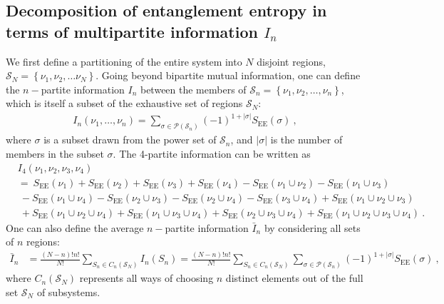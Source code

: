 \subsection{Decomposition of entanglement entropy in terms of multipartite information \(I_n\)}\label{entanglementDecomposition}
We first define a partitioning of the entire system into \(N\) disjoint regions, \(\mathcal{S}_N = \left\{ \nu_1, \nu_2,\ldots\nu_N\right\} \). Going beyond bipartite mutual information, one can define the \(n-\)partite information \(I_n\) between the members of \(\mathcal{S}_n = \left\{\nu_1,\nu_2,\ldots,\nu_n\right\} \), which is itself a subset of the exhaustive set of regions \(\mathcal{S}_N\):
\begin{equation}\begin{aligned}
	I_n(\nu_1,\ldots,\nu_n) = \sum_{\sigma \in \mathcal{P}\left(\mathcal{S}_n\right)} (-1)^{1 + |\sigma|} S_\text{EE}(\sigma)~,
\end{aligned}\end{equation}
where \(\sigma\) is a subset drawn from the power set of \(\mathcal{S}_n\), and \(|\sigma|\) is the number of members in the subset \(\sigma\). The 4-partite information can be written as
\begin{equation}\begin{aligned}
	&I_4(\nu_1,\nu_2,\nu_3,\nu_4) \\
	&=  ~ S_\text{EE}(\nu_1) + S_\text{EE}(\nu_2) + S_\text{EE}(\nu_3) + S_\text{EE}(\nu_4) - S_\text{EE}(\nu_1 \cup \nu_2) - S_\text{EE}(\nu_1 \cup \nu_3) \\
		  &~ - S_\text{EE}(\nu_1 \cup \nu_4) - S_\text{EE}(\nu_2 \cup \nu_3) - S_\text{EE}(\nu_2 \cup \nu_4) - S_\text{EE}(\nu_3 \cup \nu_4)  + S_\text{EE}(\nu_1 \cup \nu_2 \cup \nu_3)\\
		  &~ + S_\text{EE}(\nu_1 \cup \nu_2 \cup \nu_4) + S_\text{EE}(\nu_1 \cup \nu_3 \cup \nu_4) + S_\text{EE}(\nu_2 \cup \nu_3 \cup \nu_4) + S_\text{EE}(\nu_1 \cup \nu_2 \cup \nu_3 \cup \nu_4)~.
\end{aligned}\end{equation}
One can also define the average \(n-\)partite information \(\bar I_n\) by considering all sets of \(n\) regions:
\begin{equation}\begin{aligned}
	\bar I_n &= \frac{(N-n)! n!}{N!}\sum_{S_n \in C_n(\mathcal{S}_N)} I_n(S_n) = \frac{(N-n)! n!}{N!}\sum_{S_n \in C_n(\mathcal{S}_N)}\sum_{\sigma \in \mathcal{P}\left(\mathcal{S}_n\right)} (-1)^{1 + |\sigma|} S_\text{EE}(\sigma)~,
\end{aligned}\end{equation}
where \(C_n(\mathcal{S}_N)\) represents all ways of choosing \(n\) distinct elements out of the full set \(\mathcal{S}_N\) of subsystems.

